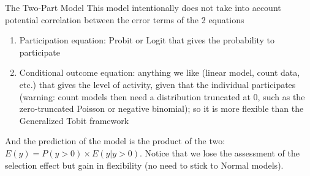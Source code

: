 \documentclass[aspectratio=169]{beamer}
\begin{document}
\begin{frame}{The Two-Part Model}
This model intentionally does not take into account potential correlation between the error terms of the 2 equations

\begin{enumerate}
    \item Participation equation: Probit or Logit that gives the probability to participate
    \item Conditional outcome equation: anything we like (linear model, count data, etc.) that gives the level of activity, given that the individual participates (warning: count models then need a distribution truncated at 0, such as the zero-truncated Poisson or negative binomial); so it is more flexible than the Generalized Tobit framework
\end{enumerate}

And the prediction of the model is the product of the two: $E(y) = P(y > 0) \times E(y|y > 0)$. Notice that we lose the assessment of the selection effect but gain in flexibility (no need to stick to Normal models).
\end{frame}
\end{document}
